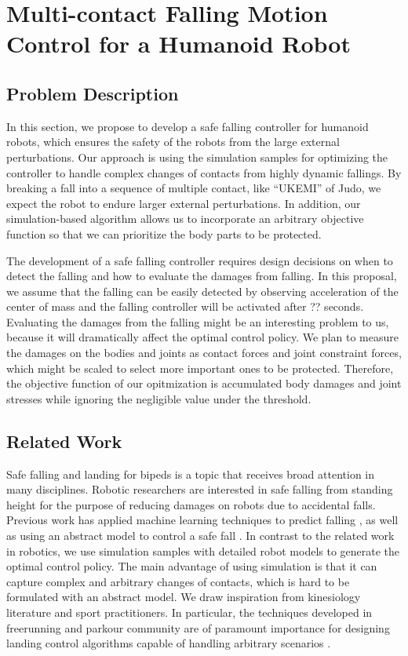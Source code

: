 \section{Multi-contact Falling Motion Control for a Humanoid Robot}

\subsection{Problem Description}

In this section, we propose to develop a safe falling controller for 
humanoid robots, which ensures the safety of the robots from the
large external perturbations.
Our approach is using the simulation samples for optimizing the controller
to handle complex changes of contacts from highly dynamic fallings.
By breaking a fall into a sequence of multiple contact, like ``UKEMI'' of Judo,
we expect the robot to endure larger external perturbations.
In addition, our simulation-based algorithm allows us to incorporate
an arbitrary objective function so that we can prioritize the body parts
to be protected.

The development of a safe falling controller requires design decisions
on when to detect the falling and how to evaluate the damages from falling.
In this proposal, we assume that the falling can be easily detected 
by observing acceleration of the center of mass and the 
falling controller will be activated after ?? seconds.
Evaluating the damages from the falling might be an interesting problem
to us, because it will dramatically affect the optimal control policy.
We plan to measure the damages on the bodies and joints
as contact forces and joint constraint forces, which might be
scaled to select more important ones to be protected.
Therefore, the objective function of our opitmization is accumulated body
damages and joint stresses while ignoring the negligible value
under the threshold.

\subsection{Related Work}

Safe falling and landing for bipeds is a topic that
receives broad attention in many disciplines. Robotic researchers are
interested in safe falling from standing height for the purpose of
reducing damages on robots due to accidental falls. Previous work has
applied machine learning techniques to predict falling
\cite{Kalyanakrishnan:2011:LPH}, as well as using an abstract model to
control a safe fall
\cite{Fujiwara:2002:FMC,Fujiwara:2007:OPF,Yun:2009:SFH}. 
In contrast to the related work in robotics, we use simulation samples
with detailed robot models to generate the optimal control policy.
The main advantage of using simulation is that it can capture
complex and arbitrary changes of contacts, which is hard to be 
formulated with an abstract model.
We draw inspiration from kinesiology literature and sport practitioners. 
In particular, the techniques developed in freerunning and parkour 
community are of paramount importance for designing landing control 
algorithms capable of handling arbitrary scenarios
\cite{Edwardes:2009:TPF,HLJ:2011:URL}. 

